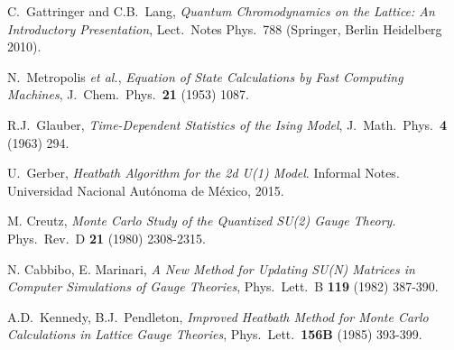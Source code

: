 \documentclass[12pt,a4paper]{article}
\begin{document}
\begin{thebibliography}{99}

 C.\ Gattringer and C.B.\ Lang, \emph{Quantum Chromodynamics on the Lattice: An Introductory Presentation},  Lect.\ Notes Phys.\ 788 (Springer, Berlin Heidelberg 2010).

 N.\ Metropolis {\it et al.},
\emph{Equation of State Calculations by Fast Computing Machines},
J.\ Chem.\ Phys.\ {\bf 21} (1953) 1087.

 R.J.\ Glauber,
  \emph{Time-Dependent Statistics of the Ising Model},
  J.\ Math.\ Phys.\ {\bf 4} (1963) 294.
  
 U.\ Gerber,
  \emph{Heatbath Algorithm for the 2d U(1) Model}.
  Informal Notes. Universidad Nacional Autónoma de México, 2015.  
  
   M. Creutz, \emph{Monte Carlo Study of the Quantized SU(2) Gauge Theory.} Phys.\ Rev.\ D {\bf 21} (1980) 2308-2315.

 N. Cabbibo, E. Marinari, \emph{A New Method for Updating SU(N) Matrices in Computer Simulations of Gauge Theories}, Phys.\ Lett.\ B {\bf 119} (1982) 387-390.

 A.D.\ Kennedy, B.J.\ Pendleton, \emph{Improved Heatbath Method for Monte Carlo Calculations in Lattice Gauge Theories}, Phys.\ Lett.\ {\bf 156B} (1985) 393-399.
\end{thebibliography}
\end{document}
